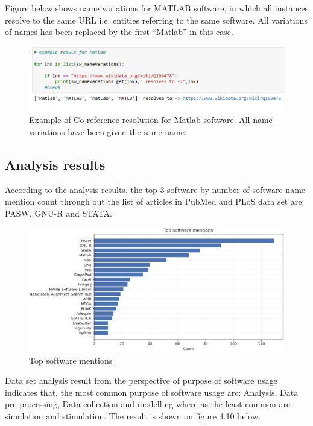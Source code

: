 Figure below shows name variations for MATLAB software, in which all instances resolve to the same URL i.e. entities referring to the same software. All variations of names has been replaced by the first “Matlab” in this case.

\begin{figure}[htbp]
	\centering
	\includegraphics[width=1\textwidth]{4.graphics/figures/ch_4/pdf/Corefresolution}
	\caption{Example of Co-reference resolution for Matlab software. All name variations have been given the same name.}
	\label{fig:chapter04:setup}
\end{figure}


\subsection{Analysis results }
\label{subsec:dataset:Analysis:results}

According to the analysis results, the top 3 software by number of software name mention count through out the list of articles in PubMed and PLoS data set are: PASW, GNU-R and STATA.  

\begin{figure}[htbp]
	\centering
	\includegraphics[width=.90\textwidth]{4.graphics/figures/ch_4/analysisresults/1.Top software mentions}
	\caption{Top software mentions}
	\label{fig:chapter03:setup}
\end{figure}

Data set analysis result from the perspective of purpose of software usage indicates that, the most common purpose of software usage are: Analysis, Data pre-processing, Data collection and modelling where as the least common are simulation and stimulation. The result is shown on figure 4.10 below. \\

